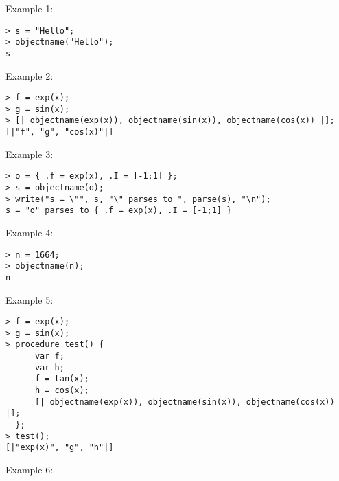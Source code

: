 \noindent Example 1: 
\begin{center}\begin{minipage}{15cm}\begin{Verbatim}[frame=single]
> s = "Hello";
> objectname("Hello");
s
\end{Verbatim}
\end{minipage}\end{center}
\noindent Example 2: 
\begin{center}\begin{minipage}{15cm}\begin{Verbatim}[frame=single]
> f = exp(x);
> g = sin(x);
> [| objectname(exp(x)), objectname(sin(x)), objectname(cos(x)) |];
[|"f", "g", "cos(x)"|]
\end{Verbatim}
\end{minipage}\end{center}
\noindent Example 3: 
\begin{center}\begin{minipage}{15cm}\begin{Verbatim}[frame=single]
> o = { .f = exp(x), .I = [-1;1] };
> s = objectname(o);
> write("s = \"", s, "\" parses to ", parse(s), "\n");
s = "o" parses to { .f = exp(x), .I = [-1;1] }
\end{Verbatim}
\end{minipage}\end{center}
\noindent Example 4: 
\begin{center}\begin{minipage}{15cm}\begin{Verbatim}[frame=single]
> n = 1664;
> objectname(n);
n
\end{Verbatim}
\end{minipage}\end{center}
\noindent Example 5: 
\begin{center}\begin{minipage}{15cm}\begin{Verbatim}[frame=single]
> f = exp(x);
> g = sin(x);
> procedure test() {
      var f;
      var h;
      f = tan(x);
      h = cos(x);
      [| objectname(exp(x)), objectname(sin(x)), objectname(cos(x)) |];
  };
> test();
[|"exp(x)", "g", "h"|]
\end{Verbatim}
\end{minipage}\end{center}
\noindent Example 6: 
